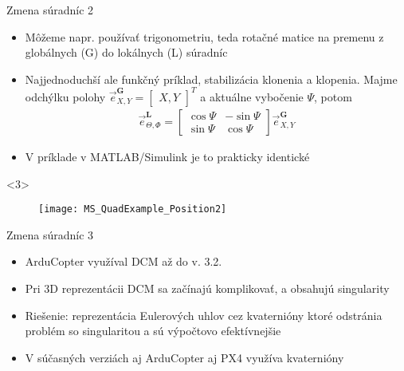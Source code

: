  \begin{frame}[t]{Zmena súradníc 2}
\begin{itemize}
  \item<1-> Môžeme napr. používať trigonometriu, teda rotačné matice  na premenu z globálnych (G) do lokálnych (L) súradníc
  \item<2-> Najjednoduchší ale funkčný príklad, stabilizácia klonenia a klopenia. Majme odchýlku polohy $\vec{e}^{\mathbf{G}}_{X,Y}=\begin{bmatrix}X,Y\end{bmatrix}^T$ a aktuálne vybočenie $\Psi$, potom \citep{BenAri2017}
      \begin{align}
      \vec{e}^{\mathbf{L}}_{\Theta,\Phi}=
      \begin{bmatrix}
          \cos{\Psi} & -\sin{\Psi} \\
          \sin{\Psi} & \cos{\Psi}
      \end{bmatrix}
      \vec{e}^{\mathbf{G}}_{X,Y}
      \end{align}
  \item<3-> V príklade v MATLAB/Simulink je to prakticky identické
\end{itemize}

  \begin{onlyenv}<3>
  \begin{figure}
\centering
  \texttt{[image: MS\_QuadExample\_Position2]}\\
\end{figure}
\end{onlyenv}

\end{frame}


 \begin{frame}[t]{Zmena súradníc 3}
\begin{itemize}
  \item<1-> ArduCopter využíval DCM až do v. 3.2.
   \item<2-> Pri 3D reprezentácii DCM sa začínajú komplikovať, a obsahujú singularity \citep{BenAri2017}
   \item<3-> Riešenie: reprezentácia Eulerových uhlov cez kvaternióny  ktoré odstránia problém so singularitou a sú výpočtovo efektívnejšie \citep{BenAri2017}
       \item<4-> V súčasných verziách aj ArduCopter aj PX4 využíva kvaternióny
\end{itemize}
\end{frame}



